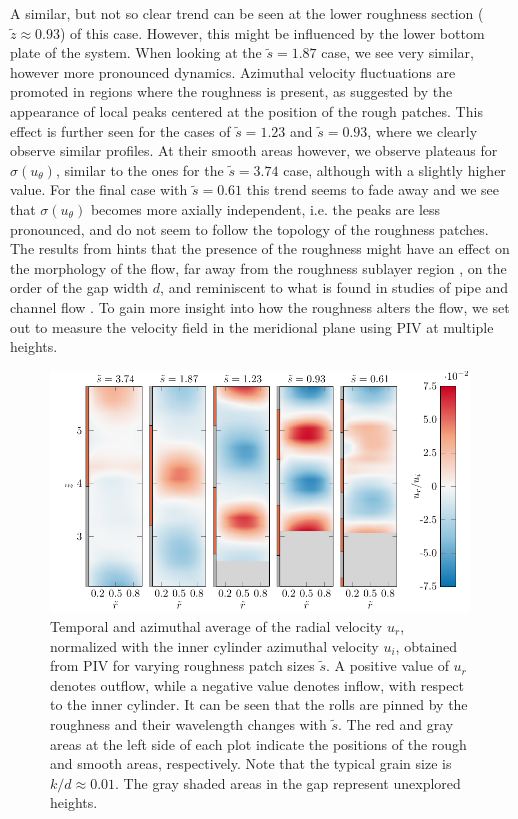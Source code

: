 A similar, but not so clear trend can be seen at the lower roughness section ($\tilde z \approx 0.93$) of this case. However, this might be influenced by the lower bottom plate of the system.
When looking at the $\tilde s=1.87$ case, we see very similar, however more pronounced dynamics. Azimuthal velocity fluctuations are promoted in regions where the roughness is present, as suggested by the appearance of local peaks centered at the position of the rough patches. This effect is further seen for the cases of $\tilde{s}=1.23$ and $\tilde{s}=0.93$, where we clearly observe similar profiles. At their smooth areas however, we observe plateaus for $\sigma(u_\theta)$, similar to the ones for the $\tilde s=3.74$ case, although with a slightly higher value. For the final case with $\tilde s=0.61$ this trend seems to fade away and we see that $\sigma(u_\theta)$ becomes more axially independent, i.e. the peaks are less pronounced, and do not seem to follow the topology of the roughness patches.
The results from  hints that the presence of the roughness might have an effect on the morphology of the flow, far away from the roughness sublayer region \citep{Berghout2018}, on the order of the gap width $d$, and reminiscent to what is found in studies of pipe and channel flow \citep{Koeltzsch2002,Chung2018}. To gain more insight into how the roughness alters the flow, we set out to measure the velocity field in the meridional plane using PIV at multiple heights.

\begin{figure}
\centering
\includegraphics[width=0.99\textwidth]{fig4_pivRolls.pdf}
\caption{Temporal and azimuthal average of the radial velocity $u_r$, normalized with the inner cylinder azimuthal velocity $u_i$, obtained from PIV for varying roughness patch sizes $\tilde{s}$. A positive value of $u_r$ denotes outflow, while a negative value denotes inflow, with respect to the inner cylinder. It can be seen that the rolls are pinned by the roughness and their wavelength changes with $\tilde{s}$.
The red and gray areas at the left side of each plot indicate the positions of the rough and smooth areas, respectively.
Note that the typical grain size is $k/d \approx 0.01$. The gray shaded areas in the gap represent unexplored heights.}
\label{fig:exppiv}
\end{figure}

